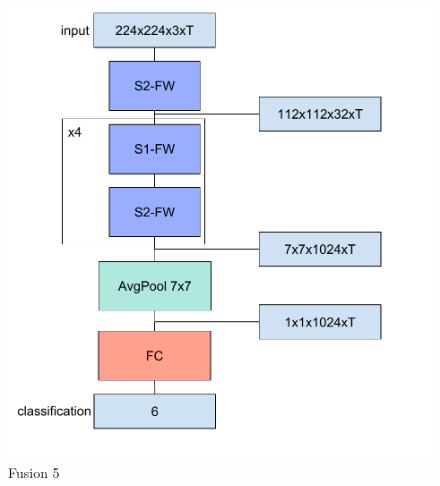 \begin{figure}%
\includegraphics[width=\columnwidth]{figures/Reseau1Fusion5.pdf}%
\caption{Fusion 5}%
\label{fig:fusion5}%
\end{figure}


%
%
%
%
%
%
%
%
%
%
%
%
%
%
%
%
%



